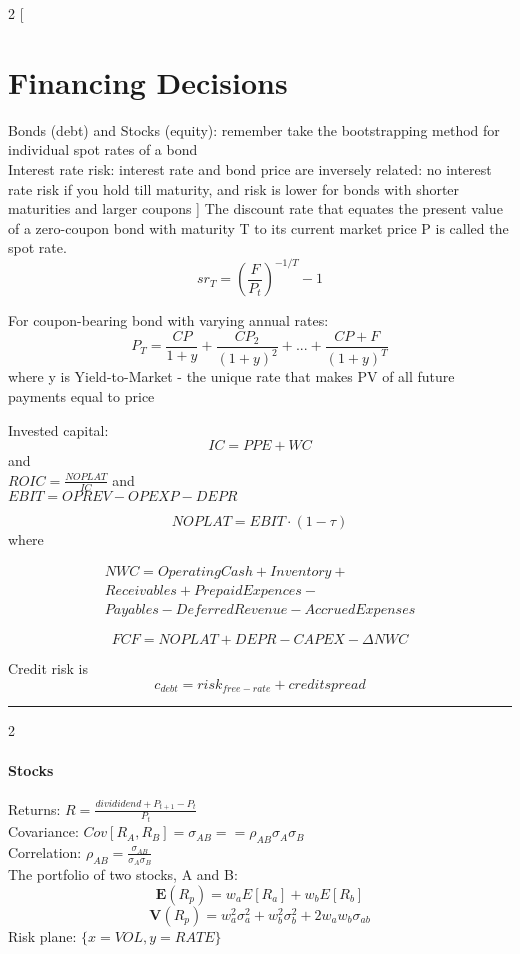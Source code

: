 \documentclass[8pt]{report}
\begin{document}
\begin{multicols}{2}
[
\section{Financing Decisions}
Bonds (debt) and Stocks (equity): remember  take the bootstrapping method for individual spot rates of a bond \\
Interest rate risk: interest rate and bond price are inversely related: no interest rate risk if you hold till maturity, and risk is lower for bonds with shorter maturities and larger coupons
]
The discount rate that equates the present value of a zero-coupon bond
with maturity T to its current market price P is called the spot rate.
$$
	sr_T = (\frac{F}{P_t})^{-1/T} - 1
$$

For coupon-bearing bond with varying annual rates:
$$
	P_T = \frac{CP}{1+y} + \frac{CP_2}{(1+y)^2} + ... + \frac{CP+F}{(1+y)^T}	
$$ where y is Yield-to-Market - the unique rate that makes PV of all future payments equal to price

Invested capital: $$ IC = PPE + WC $$ and \\
$ ROIC = \frac{NOPLAT}{IC} $ and \\
$ EBIT = OPREV - OPEXP - DEPR $

$$ NOPLAT = EBIT \cdot (1 - \tau) $$ where

 \begin{align*}
 NWC = Operating Cash+Inventory + \\ 
 Receivables + 
 Prepaid Expences  - \\ 
 Payables - Deferred Revenue - Accrued Expenses 
 \end{align*}
 

$$
	FCF = NOPLAT + DEPR - CAPEX - \Delta NWC
$$

Credit risk is $$ c_{debt} = risk_{free-rate} + credit spread $$
\end{multicols}
\hrule 
\begin{multicols}{2}
\paragraph{Stocks}
Returns: $ R = \frac{divididend + P_{t+1} - P_t} {P_t}$ \\
Covariance: $ Cov[R_A, R_B] = \sigma_{AB} == \rho_{AB}\sigma_A\sigma_B $ \\
Correlation: $ \rho_{AB} = \frac{\sigma_{AB}} {\sigma_A \sigma_B} $\\


The portfolio of two stocks, A and B: 
$$
	\mathbf{E}(R_p) = w_aE[R_a] + w_bE[R_b]
$$
$$
	\mathbf{V}(R_p) = w_a^2\sigma_a^2 + w_b^2\sigma_b^2 + 2 w_a w_b \sigma_{ab}
$$
Risk plane: $\{x=VOL, y=RATE\}$
\end{multicols}
\end{document}

